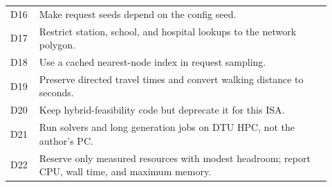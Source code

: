 \begin{longtable}{@{}p{0.08\linewidth}p{0.84\linewidth}@{}}
D16 & Make request seeds depend on the config seed.\\
D17 & Restrict station, school, and hospital lookups to the network polygon.\\
D18 & Use a cached nearest-node index in request sampling.\\
D19 & Preserve directed travel times and convert walking distance to seconds.\\
D20 & Keep hybrid-feasibility code but deprecate it for this ISA.\\
D21 & Run solvers and long generation jobs on DTU HPC, not the author's PC.\\
D22 & Reserve only measured resources with modest headroom; report CPU, wall time, and maximum memory.\\
\bottomrule
\end{longtable}
